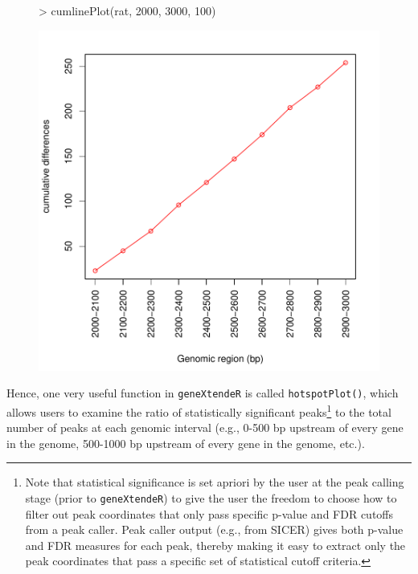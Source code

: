 \documentclass[12pt]{article}
\begin{document}
\begin{figure}[H]
\begin{center}
\begin{Schunk}
\begin{Sinput}
> cumlinePlot(rat, 2000, 3000, 100)
\end{Sinput}
\end{Schunk}
\includegraphics{geneXtendeR-018}
\end{center}
\end{figure}

Hence, one very useful function in \texttt{geneXtendeR} is called \texttt{hotspotPlot()}, which allows users to examine the ratio of statistically significant peaks\footnote{Note that statistical significance is set apriori by the user at the peak calling stage (prior to \texttt{geneXtendeR}) to give the user the freedom to choose how to filter out peak coordinates that only pass specific p-value and FDR cutoffs from a peak caller.  Peak caller output (e.g., from SICER) gives both p-value and FDR measures for each peak, thereby making it easy to extract only the peak coordinates that pass a specific set of statistical cutoff criteria.} to the total number of peaks at each genomic interval (e.g., 0-500 bp upstream of every gene in the genome, 500-1000 bp upstream of every gene in the genome, etc.). 
\end{document}
